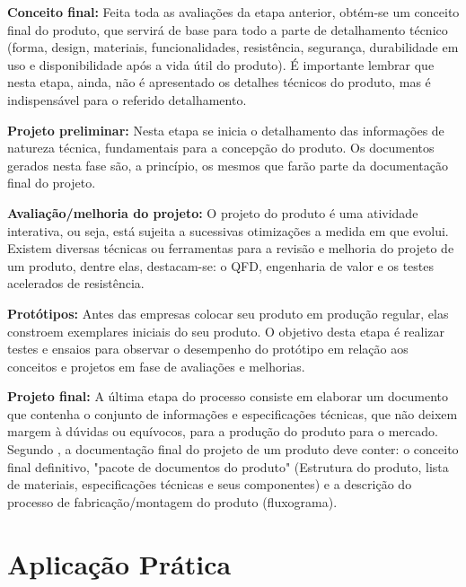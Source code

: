 \textbf{Conceito final:} Feita toda as avaliações da etapa anterior, obtém-se um conceito final do produto, que servirá de base para todo a parte de detalhamento técnico (forma, design, materiais, funcionalidades, resistência, segurança, durabilidade em uso e disponibilidade após a vida útil do produto). É importante lembrar que nesta etapa, ainda, não é apresentado os detalhes técnicos do produto, mas é indispensável para o referido detalhamento.

\textbf{Projeto preliminar:} Nesta etapa se inicia o detalhamento das informações de natureza técnica, fundamentais para a concepção do produto. Os documentos gerados nesta fase são, a princípio, os mesmos que farão parte da documentação final do projeto.

\textbf{Avaliação/melhoria do projeto:} O projeto do produto é uma atividade interativa, ou seja, está sujeita a sucessivas otimizações a medida em que evolui. Existem diversas técnicas ou ferramentas para a revisão e melhoria do projeto de um produto, dentre elas, destacam-se: o \ac{QFD}, engenharia de valor e os testes acelerados de resistência.

\textbf{Protótipos:} Antes das empresas colocar seu produto em produção regular, elas constroem exemplares iniciais do seu produto. O objetivo desta etapa é realizar testes e ensaios para observar o desempenho do protótipo em relação aos conceitos e projetos em fase de avaliações e melhorias.

\textbf{Projeto final:} A última etapa do processo consiste em elaborar um documento que contenha o conjunto de informações e especificações técnicas, que não deixem margem à dúvidas ou equívocos, para a produção do produto para o mercado. Segundo \cite{slack2006administracao}, a documentação final do projeto de um produto deve conter: o conceito final definitivo, "pacote de documentos do produto" (Estrutura do produto, lista de materiais, especificações técnicas e seus componentes) e a descrição do processo de fabricação/montagem do produto (fluxograma). 


\section{Aplicação Prática} 
\label{sec:projeto_do_produto_aplicacao}